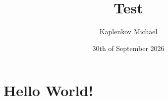 \documentclass{article}
\title{Test}
\author{Kaplenkov Michael}
\date{30th of September 2026}
\begin{document}
\maketitle

\section{Hello World!}
\end{document}
